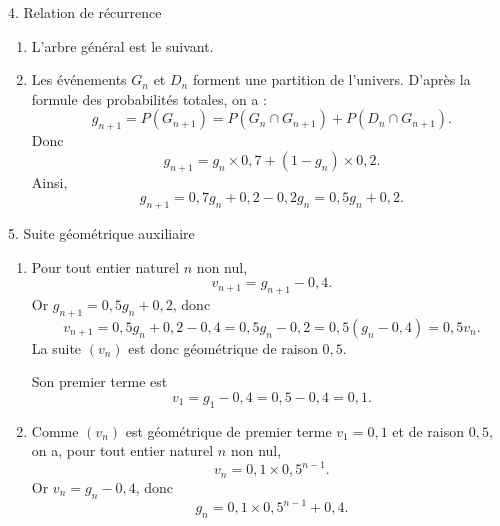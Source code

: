 \documentclass[11pt,a4paper]{article}
\begin{document}
\begin{correctionbox}{4. Relation de récurrence}
\begin{enumerate}
  \item L'arbre général est le suivant.
  \begin{center}
  \end{center}

  \item Les événements $G_n$ et $D_n$ forment une partition de l'univers. D'après la formule des probabilités totales, on a :
  \[
  g_{n+1}=P(G_{n+1})=P(G_n\cap G_{n+1})+P(D_n\cap G_{n+1}).
  \]
  Donc
  \[
  g_{n+1}=g_n\times0{,}7+(1-g_n)\times0{,}2.
  \]
  Ainsi,
  \[
  g_{n+1}=0{,}7g_n+0{,}2-0{,}2g_n=0{,}5g_n+0{,}2.
  \]
\end{enumerate}
\end{correctionbox}

\begin{correctionbox}{5. Suite géométrique auxiliaire}
\begin{enumerate}
  \item Pour tout entier naturel $n$ non nul,
  \[
  v_{n+1}=g_{n+1}-0{,}4.
  \]
  Or $g_{n+1}=0{,}5g_n+0{,}2$, donc
  \[
  v_{n+1}=0{,}5g_n+0{,}2-0{,}4=0{,}5g_n-0{,}2=0{,}5(g_n-0{,}4)=0{,}5v_n.
  \]
  La suite $(v_n)$ est donc géométrique de raison $0{,}5$.

  Son premier terme est
  \[
  v_1=g_1-0{,}4=0{,}5-0{,}4=0{,}1.
  \]

  \item Comme $(v_n)$ est géométrique de premier terme $v_1=0{,}1$ et de raison $0{,}5$, on a, pour tout entier naturel $n$ non nul,
  \[
  v_n=0{,}1\times0{,}5^{n-1}.
  \]
  Or $v_n=g_n-0{,}4$, donc
  \[
  g_n=0{,}1\times0{,}5^{n-1}+0{,}4.
  \]
\end{enumerate}
\end{correctionbox}
\end{document}
